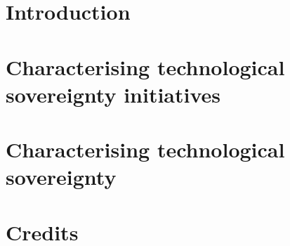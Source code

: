 \documentclass[a5paper,11pt]{book}
\begin{document}
\pagestyle{empty}
\frontmatter
\begin{center}
 \hspace{0pt}
  \vfill
  \vspace*{0.2\textheight}
  
  \vfill
 \hspace{0pt}
\end{center}
\pagebreak
\maketitle

\pagestyle{fancy}



\tableofcontents

\chapter{\prefacename}


\mainmatter
\chapter{Introduction}
 

\chapter{Characterising technological sovereignty initiatives}
 
 
 
 
 

\chapter{Characterising technological sovereignty}
 
 
 
 
 

\chapter{Credits}
 
\end{document}
